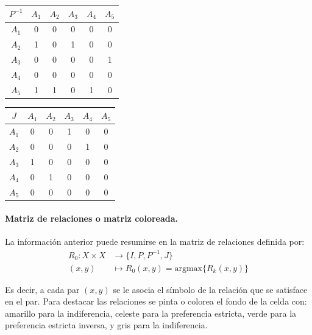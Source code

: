 \documentclass[a5paper,doc,10pt,noapacite]{apa6}
\begin{document}
{{\begin{table}[H]
   \fontsize{7}{11}\selectfont
    \begin{minipage}{.5\linewidth}
      \centering
	\begin{tabular}{c|ccccc} \thickline
	\(P^{-1}\) & \(A_1\) & \(A_2\) & \(A_3\) & \(A_4\) & \(A_5\)  \\ \hline
    \(A_1\) & 0 & 0 & 0 & 0 & 0  \\
    \(A_2\) & 1 & 0 & 1 & 0 & 0  \\
	\(A_3\) & 0 & 0 & 0 & 0 & 1   \\
	\(A_4\) & 0 & 0 & 0 & 0 & 0   \\
	\(A_5\) & 1 & 1 & 0 & 1 & 0   \\
\end{tabular}
\label{tab:B4} 
    \end{minipage}%
    \begin{minipage}{.5\linewidth}
      \centering
	\begin{tabular}{c|ccccc} \thickline
	\(J\) & \(A_1\) & \(A_2\) & \(A_3\) & \(A_4\) & \(A_5\)  \\ \hline
    \(A_1\) & 0 & 0 & 1 & 0 & 0  \\
    \(A_2\) & 0 & 0 & 0 & 1 & 0  \\
	\(A_3\) & 1 & 0 & 0 & 0 & 0   \\
	\(A_4\) & 0 & 1 & 0 & 0 & 0   \\
	\(A_5\) & 0 & 0 & 0 & 0 & 0   \\
\end{tabular}
\label{tab:B5} 
    \end{minipage} 
\end{table}

\paragraph{Matriz de relaciones o matriz coloreada.}

La información anterior puede resumirse en la matriz de relaciones definida por:
\begin{align*}
    R_0 : X \times X & \longrightarrow \big\{I, P , P^{-1}, J \big\} \\
    (x,y) & \mapsto R_0(x,y) = \text{argmax} \big\{R_k(x,y)\big\}
\end{align*}

Es decir, a cada par \((x,y)\) se le asocia el símbolo de la relación que se satisface en el par. Para destacar las relaciones se pinta o colorea el fondo de la celda con: amarillo para la indiferencia, celeste para la preferencia estricta, verde para la preferencia estricta inversa, y gris para la indiferencia.


}}
\end{document}

